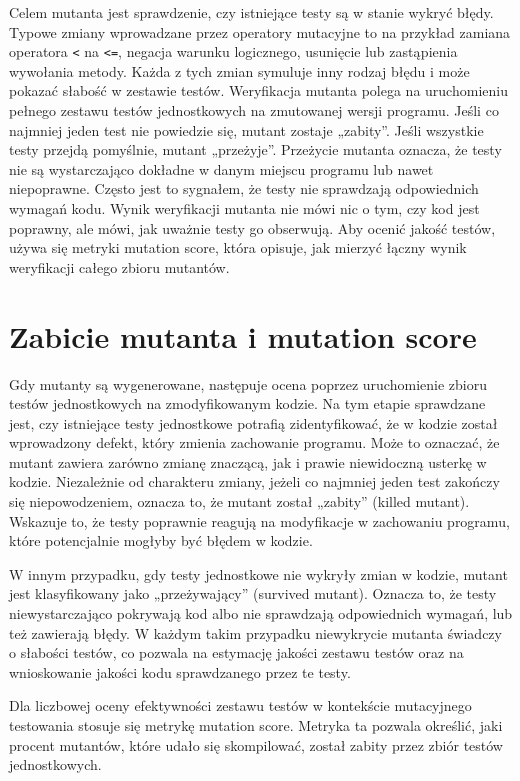 \documentclass[12pt,a4paper,oldfontcommands]{memoir}
\theoremstyle{plain}
\theoremstyle{definition}
\theoremstyle{remark}
\begin{document}
    Celem mutanta jest sprawdzenie, czy istniejące testy są w stanie wykryć błędy.
    Typowe zmiany wprowadzane przez operatory mutacyjne to na przykład zamiana operatora \texttt{\textless} na \texttt{\textless=}, negacja warunku logicznego, usunięcie lub zastąpienia wywołania metody.
    Każda z tych zmian symuluje inny rodzaj błędu i może pokazać słabość w zestawie testów.
    Weryfikacja mutanta polega na uruchomieniu pełnego zestawu testów jednostkowych na zmutowanej wersji programu.
    Jeśli co najmniej jeden test nie powiedzie się, mutant zostaje „zabity”.
    Jeśli wszystkie testy przejdą pomyślnie, mutant „przeżyje”.
    Przeżycie mutanta oznacza, że testy nie są wystarczająco dokładne w danym miejscu programu lub nawet niepoprawne.
    Często jest to sygnałem, że testy nie sprawdzają odpowiednich wymagań kodu.
    Wynik weryfikacji mutanta nie mówi nic o tym, czy kod jest poprawny, ale mówi, jak uważnie testy go obserwują.
    Aby ocenić jakość testów, używa się metryki mutation score, która opisuje, jak mierzyć łączny wynik weryfikacji całego zbioru mutantów.

    \section{Zabicie mutanta i mutation score}

    Gdy mutanty są wygenerowane, następuje ocena poprzez uruchomienie zbioru testów jednostkowych na zmodyfikowanym kodzie.
    Na tym etapie sprawdzane jest, czy istniejące testy jednostkowe potrafią zidentyfikować, że w kodzie został wprowadzony defekt, który zmienia zachowanie programu.
    Może to oznaczać, że mutant zawiera zarówno zmianę znaczącą, jak i prawie niewidoczną usterkę w kodzie.
    Niezależnie od charakteru zmiany, jeżeli co najmniej jeden test zakończy się niepowodzeniem, oznacza to, że mutant został „zabity” (killed mutant).
    Wskazuje to, że testy poprawnie reagują na modyfikacje w zachowaniu programu, które potencjalnie mogłyby być błędem w kodzie.

    W innym przypadku, gdy testy jednostkowe nie wykryły zmian w kodzie, mutant jest klasyfikowany jako „przeżywający” (survived mutant).
    Oznacza to, że testy niewystarczająco pokrywają kod albo nie sprawdzają odpowiednich wymagań, lub też zawierają błędy.
    W każdym takim przypadku niewykrycie mutanta świadczy o słabości testów, co pozwala na estymację jakości zestawu testów oraz na wnioskowanie jakości kodu sprawdzanego przez te testy.

    Dla liczbowej oceny efektywności zestawu testów w kontekście mutacyjnego testowania stosuje się metrykę mutation score.
    Metryka ta pozwala określić, jaki procent mutantów, które udało się skompilować, został zabity przez zbiór testów jednostkowych.
\end{document}
